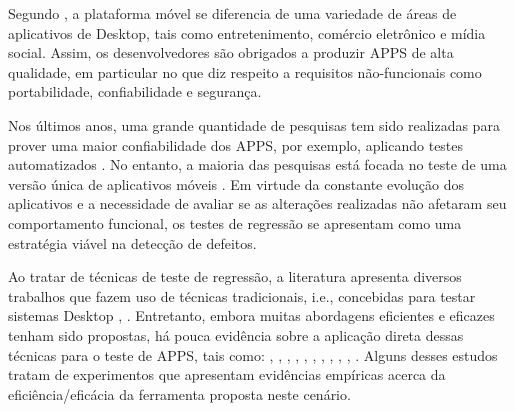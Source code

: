 Segundo , a plataforma móvel se diferencia de uma variedade de áreas de aplicativos de Desktop, tais como entretenimento, comércio eletrônico e mídia social. Assim, os desenvolvedores são obrigados a produzir \ac{APPS} de alta qualidade, em particular no que diz respeito a requisitos não-funcionais como portabilidade, confiabilidade e segurança.

Nos últimos anos, uma grande quantidade de pesquisas tem sido realizadas para prover uma maior confiabilidade dos \ac{APPS}, por exemplo, aplicando testes automatizados \cite{7927972, 8424973, 8453877}. No entanto, a maioria das pesquisas está focada no teste de uma versão única de aplicativos móveis \cite{Do2016RedroidAR}. Em virtude da constante evolução dos aplicativos e a necessidade de avaliar se as alterações realizadas não afetaram seu comportamento funcional, os testes de regressão se apresentam como uma estratégia viável \cite{8377661} na detecção de defeitos.   

Ao tratar de técnicas de teste de regressão, a literatura apresenta diversos trabalhos que fazem uso de técnicas tradicionais, i.e., concebidas para testar sistemas Desktop \cite{536955}, \cite{ENGSTROM201014}. Entretanto, embora muitas abordagens eficientes e eficazes tenham sido propostas, há pouca evidência sobre a aplicação direta dessas técnicas para o teste de \ac{APPS}, tais como:   \cite{Choi:2018:DMA:3180155.3180173}, \cite{8377661}, \cite{Do2016RedroidAR}, \cite{5954416}, \cite{7927972}, \cite{8424973}, \cite{6339502}, \cite{6569773}, \cite{7427895}, \cite{7832883}, \cite{7833000}. Alguns desses estudos tratam de experimentos que apresentam evidências empíricas acerca da eficiência/eficácia da ferramenta proposta neste cenário.


